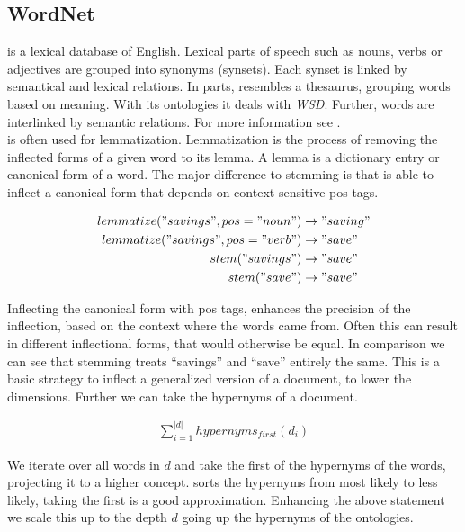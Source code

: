   \subsection{WordNet}
  \label{sec:wordnet}

  \wordnet{} is a lexical database of English. Lexical parts of speech such as nouns, verbs or adjectives are grouped into synonyms (synsets). Each synset is linked by semantical and lexical relations. In parts, \wordnet{} resembles a thesaurus, grouping words based on meaning. With its ontologies it deals with \emph{WSD}. Further, words are interlinked by semantic relations. For more information see \cite{Wordnet1995, Wordnet1998}. \\
  \wordnet{} is often used for lemmatization. Lemmatization is the process of removing the inflected forms of a given word to its lemma. A lemma is a dictionary entry or canonical form of a word. The major difference to stemming is that \wordnet{} is able to inflect a canonical form that depends on context sensitive pos tags. 

    \begin{equation}
    \begin{split}
      lemmatize("savings", pos="noun") &\to "saving" \\
      lemmatize("savings", pos="verb") &\to "save" \\
      stem("savings") &\to "save" \\
      stem("save") &\to "save"
    \end{split}
    \end{equation}

  Inflecting the canonical form with pos tags, enhances the precision of the inflection, based on the context where the words came from. Often this can result in different inflectional forms, that would otherwise be equal. In comparison we can see that stemming treats ``savings'' and ``save'' entirely the same. This is a basic strategy to inflect a generalized version of a document, to lower the dimensions. Further we can take the hypernyms of a document.

    \begin{equation}
    \begin{split}
      \sum_{i=1}^{|d|} hypernyms_{first}(d_i)
    \end{split}
    \end{equation}

  We iterate over all words in $d$ and take the first of the hypernyms of the words, projecting it to a higher concept. \wordnet{} sorts the hypernyms from most likely to less likely, taking the first is a good approximation.
  Enhancing the above statement we scale this up to the depth $d$ going up the hypernyms of the \wordnet{} ontologies.

